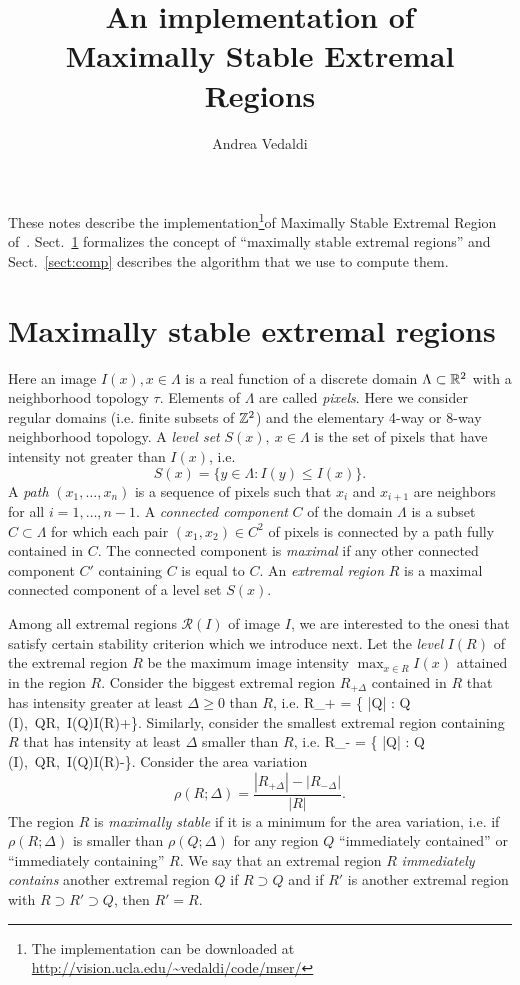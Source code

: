 \documentclass{article}
\title{An implementation of \\ Maximally Stable Extremal Regions}
\author{Andrea Vedaldi}
\begin{document}
\maketitle{}

These notes describe the implementation\footnote{The implementation can be downloaded at \url{http://vision.ucla.edu/~vedaldi/code/mser/}}of Maximally Stable Extremal Region of~\cite{matas03robust}. Sect.~\ref{sect:def} formalizes the concept of ``maximally stable extremal regions'' and Sect.~\ref{sect:comp} describes the algorithm that we use to compute them.

\section{Maximally stable extremal regions}\label{sect:def}

Here an image $I(x), x\in\Lambda$ is a real function of a discrete domain $\Lambda\subset\mathbb{R}^2$ with a neighborhood topology $\tau$. Elements of $\Lambda$ are called {\em pixels}. Here we consider regular domains (i.e. finite subsets of $\mathbb{Z}^2$) and the elementary 4-way or 8-way neighborhood topology. A {\em level set} $S(x),\ x \in\Lambda$  is the set of pixels that have intensity not greater than $I(x)$, i.e.
\[
 S(x) = \{ y\in\Lambda : I(y) \leq I(x) \}.
\]
A {\em path} $(x_1,\dots,x_n)$ is a sequence of pixels such that $x_i$ and $x_{i+1}$ are neighbors for all $i=1,\dots,n-1$. A {\em connected component} $C$ of the domain $\Lambda$ is a subset $C\subset\Lambda$ for which each pair $(x_1,x_2)\in C^2$ of pixels is connected by a path fully contained in $C$. The connected component is {\em maximal} if any other connected component $C'$ containing $C$ is equal to $C$. An {\em extremal region} $R$ is a maximal connected component of a level set $S(x)$.

Among all extremal regions $\mathcal{R}(I)$ of image $I$, we are interested to the onesi that satisfy certain stability criterion which we introduce next. Let the {\em level} $I(R)$ of the extremal region $R$ be the maximum image intensity $\max_{x\in R} I(x)$ attained in the region $R$. Consider the biggest extremal region $R_{+\Delta}$ contained in $R$ that has intensity greater at least $\Delta\geq 0$ than $R$, i.e.
\be\label{eq:rplus}
 R_{+\Delta} = \argmax \{ |Q| : Q \in {}(I),\ Q\subset R,\ I(Q)\geq I(R)+\Delta \}.
\ee
Similarly, consider the smallest extremal region containing $R$ that has intensity at least $\Delta$ smaller than $R$, i.e.
\be\label{eq:rminus}
 R_{-\Delta} = \argmin \{ |Q| : Q \in {}(I),\ Q\supset R,\ I(Q)\leq I(R)-\Delta \}.
\ee
Consider the area variation
\[
   \rho(R;\Delta) = \frac{|R_{+\Delta}| - |R_{-\Delta}|}{|R|}.
\]
The region $R$ is {\em maximally stable} if it is a minimum for the area variation, i.e. if $\rho(R;\Delta)$ is smaller than $\rho(Q;\Delta)$ for any region $Q$ ``immediately contained'' or ``immediately containing'' $R$. We say that an extremal region $R$ {\em immediately contains} another extremal region $Q$ if $R\supset Q$ and if $R'$ is another extremal region with $R \supset R' \supset Q$, then $R'=R$.
\end{document}
